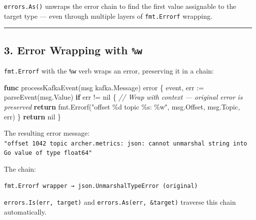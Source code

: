 \documentclass[
]{article}
\newenvironment{Shaded}{}{}
\newcommand{\CommentTok}[1]{\textcolor[rgb]{0.38,0.63,0.69}{\textit{#1}}}
\newcommand{\ControlFlowTok}[1]{\textcolor[rgb]{0.00,0.44,0.13}{\textbf{#1}}}
\newcommand{\DataTypeTok}[1]{\textcolor[rgb]{0.56,0.13,0.00}{#1}}
\newcommand{\KeywordTok}[1]{\textcolor[rgb]{0.00,0.44,0.13}{\textbf{#1}}}
\newcommand{\NormalTok}[1]{#1}
\newcommand{\OperatorTok}[1]{\textcolor[rgb]{0.40,0.40,0.40}{#1}}
\newcommand{\OtherTok}[1]{\textcolor[rgb]{0.00,0.44,0.13}{#1}}
\newcommand{\StringTok}[1]{\textcolor[rgb]{0.25,0.44,0.63}{#1}}
\begin{document}
\texttt{errors.As()} unwraps the error chain to find the first value
assignable to the target type --- even through multiple layers of
\texttt{fmt.Errorf} wrapping.

\begin{center}\rule{0.5\linewidth}{0.5pt}\end{center}

\hypertarget{error-wrapping-with-w}{%
\subsection{\texorpdfstring{3. Error Wrapping with
\texttt{\%w}}{3. Error Wrapping with \%w}}\label{error-wrapping-with-w}}

\texttt{fmt.Errorf} with the \texttt{\%w} verb wraps an error,
preserving it in a chain:

\begin{Shaded}
\begin{Highlighting}[]
\KeywordTok{func}\NormalTok{ processKafkaEvent}\OperatorTok{(}\NormalTok{msg kafka}\OperatorTok{.}\NormalTok{Message}\OperatorTok{)} \DataTypeTok{error} \OperatorTok{\{}
\NormalTok{    event}\OperatorTok{,}\NormalTok{ err }\OperatorTok{:=}\NormalTok{ parseEvent}\OperatorTok{(}\NormalTok{msg}\OperatorTok{.}\NormalTok{Value}\OperatorTok{)}
    \ControlFlowTok{if}\NormalTok{ err }\OperatorTok{!=} \OtherTok{nil} \OperatorTok{\{}
        \CommentTok{// Wrap with context — original error is preserved}
        \ControlFlowTok{return}\NormalTok{ fmt}\OperatorTok{.}\NormalTok{Errorf}\OperatorTok{(}\StringTok{"offset \%d topic \%s: \%w"}\OperatorTok{,}\NormalTok{ msg}\OperatorTok{.}\NormalTok{Offset}\OperatorTok{,}\NormalTok{ msg}\OperatorTok{.}\NormalTok{Topic}\OperatorTok{,}\NormalTok{ err}\OperatorTok{)}
    \OperatorTok{\}}
    \ControlFlowTok{return} \OtherTok{nil}
\OperatorTok{\}}
\end{Highlighting}
\end{Shaded}

The resulting error message:
\texttt{"offset\ 1042\ topic\ archer.metrics:\ json:\ cannot\ unmarshal\ string\ into\ Go\ value\ of\ type\ float64"}

The chain:

\begin{verbatim}
fmt.Errorf wrapper → json.UnmarshalTypeError (original)
\end{verbatim}

\texttt{errors.Is(err,\ target)} and \texttt{errors.As(err,\ \&target)}
traverse this chain automatically.
\end{document}
